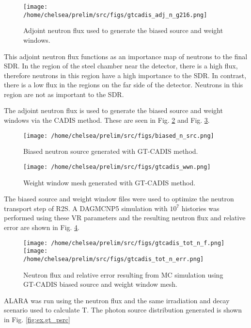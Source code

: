\begin{figure}
	\texttt{[image: /home/chelsea/prelim/src/figs/gtcadis\_adj\_n\_g216.png]}
	\caption [GT-CADIS adjoint neutron flux] 
	{Adjoint neutron flux used to generate the biased source and weight
	windows.\label{fig:ex.adj_n_flux} }
\end{figure}

This adjoint neutron flux functions as an importance map of neutrons to the
final SDR.  In the region of the steel chamber near the detector, there is a 
high flux, therefore neutrons in this region have a high importance to the SDR.
In contrast, there is a low flux in the regions on the
far side of the detector.  Neutrons in this region are not as important to the
SDR.

The adjoint neutron flux is used to generate the biased source and weight
windows via the CADIS method.  These are seen in Fig. \ref{fig:ex.biased_src} and
Fig. \ref{fig:ex.wwinp}.

\begin{figure} 
	\texttt{[image: /home/chelsea/prelim/src/figs/biased\_n\_src.png]}
	\caption [GT-CADIS biased neutron source] 
	{Biased neutron source generated with GT-CADIS method.\label{fig:ex.biased_src}}
\end{figure}

\begin{figure} 
	\texttt{[image: /home/chelsea/prelim/src/figs/gtcadis\_wwn.png]}
	\caption [GT-CADIS weight window mesh]
	{Weight window mesh generated with GT-CADIS method.\label{fig:ex.wwinp}}
\end{figure}

The biased source and weight window files were used to optimize the neutron
transport step of R2S.  A DAGMCNP5 simulation with $10^7$ histories was performed using these VR
parameters and the resulting neutron flux and relative error are shown in Fig.
\ref{fig:ex.gt_nflux}.

\begin{figure} 
	\texttt{[image: /home/chelsea/prelim/src/figs/gtcadis\_tot\_n\_f.png]}
	\texttt{[image: /home/chelsea/prelim/src/figs/gtcadis\_tot\_n\_err.png]}
	\caption [GT-CADIS neutron flux and relative error] 
	{Neutron flux and relative error resulting from MC simulation using
	 GT-CADIS biased source and weight window mesh.\label{fig:ex.gt_nflux}}
\end{figure}


ALARA was run using the neutron flux and the same irradiation and decay scenario used to calculate
T.  The photon source distribution generated is shown in Fig. \ref{fig:ex.gt_psrc}

